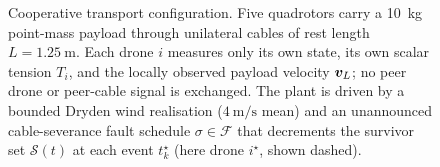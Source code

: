\begin{figure}[t]
\caption{Cooperative transport configuration. Five quadrotors carry
a \SI{10}{\kilo\gram} point-mass payload through unilateral cables of
rest length $L = \SI{1.25}{\metre}$. Each drone $i$ measures only its
own state, its own scalar tension $T_i$, and the locally observed
payload velocity $\boldsymbol{v}_L$; no peer drone or peer-cable signal is exchanged. The plant is
driven by a bounded Dryden wind realisation
($\SI{4}{\metre\per\second}$ mean) and an unannounced cable-severance
fault schedule $\sigma \in \mathcal{F}$ that decrements the survivor
set $\mathcal{S}(t)$ at each event $t_k^\star$ (here drone $i^\star$, shown
dashed).}
\label{fig:physical-setup}
\end{figure}
